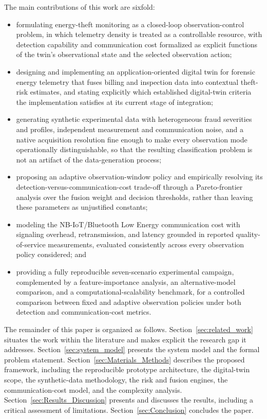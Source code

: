 \documentclass{ieeeaccess}
\begin{document}
The main contributions of this work are sixfold:
\begin{itemize}
    \item formulating energy-theft monitoring as a closed-loop observation-control problem, in which telemetry density is treated as a controllable resource, with detection capability and communication cost formalized as explicit functions of the twin's observational state and the selected observation action;
    \item designing and implementing an application-oriented digital twin for forensic energy telemetry that fuses billing and inspection data into contextual theft-risk estimates, and stating explicitly which established digital-twin criteria the implementation satisfies at its current stage of integration;
    \item generating synthetic experimental data with heterogeneous fraud severities and profiles, independent measurement and communication noise, and a native acquisition resolution fine enough to make every observation mode operationally distinguishable, so that the resulting classification problem is not an artifact of the data-generation process;
    \item proposing an adaptive observation-window policy and empirically resolving its detection-versus-communication-cost trade-off through a Pareto-frontier analysis over the fusion weight and decision thresholds, rather than leaving these parameters as unjustified constants;
    \item modeling the NB-IoT/Bluetooth Low Energy communication cost with signaling overhead, retransmission, and latency grounded in reported quality-of-service measurements, evaluated consistently across every observation policy considered; and
    \item providing a fully reproducible seven-scenario experimental campaign, complemented by a feature-importance analysis, an alternative-model comparison, and a computational-scalability benchmark, for a controlled comparison between fixed and adaptive observation policies under both detection and communication-cost metrics.
\end{itemize}

The remainder of this paper is organized as follows. Section~\ref{sec:related_work} situates the work within the literature and makes explicit the research gap it addresses. Section~\ref{sec:system_model} presents the system model and the formal problem statement. Section~\ref{sec:Materials_Methods} describes the proposed framework, including the reproducible prototype architecture, the digital-twin scope, the synthetic-data methodology, the risk and fusion engines, the communication-cost model, and the complexity analysis. Section~\ref{sec:Results_Discussion} presents and discusses the results, including a critical assessment of limitations. Section~\ref{sec:Conclusion} concludes the paper.
\end{document}
